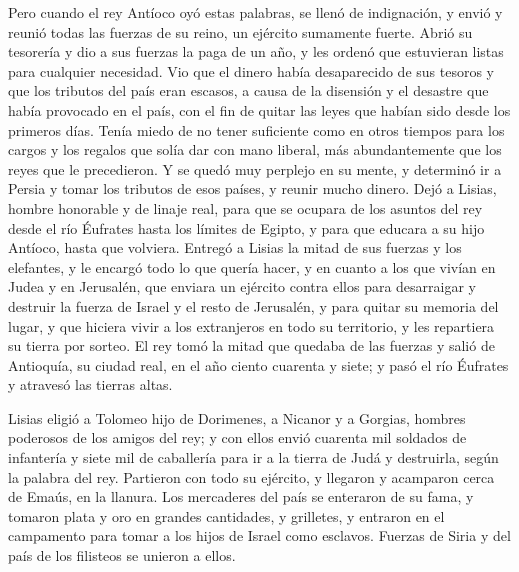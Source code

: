  Pero cuando el rey Antíoco oyó estas palabras, se llenó
de indignación, y envió y reunió todas las fuerzas de su reino, un
ejército sumamente fuerte.  Abrió su tesorería y dio a
sus fuerzas la paga de un año, y les ordenó que estuvieran listas para
cualquier necesidad.  Vio que el dinero había
desaparecido de sus tesoros y que los tributos del país eran escasos, a
causa de la disensión y el desastre que había provocado en el país, con
el fin de quitar las leyes que habían sido desde los primeros días.
 Tenía miedo de no tener suficiente como en otros tiempos
para los cargos y los regalos que solía dar con mano liberal, más
abundantemente que los reyes que le precedieron.  Y se
quedó muy perplejo en su mente, y determinó ir a Persia y tomar los
tributos de esos países, y reunir mucho dinero.  Dejó a
Lisias, hombre honorable y de linaje real, para que se ocupara de los
asuntos del rey desde el río Éufrates hasta los límites de Egipto,
 y para que educara a su hijo Antíoco, hasta que
volviera.  Entregó a Lisias la mitad de sus fuerzas y los
elefantes, y le encargó todo lo que quería hacer, y en cuanto a los que
vivían en Judea y en Jerusalén,  que enviara un ejército
contra ellos para desarraigar y destruir la fuerza de Israel y el resto
de Jerusalén, y para quitar su memoria del lugar,  y que
hiciera vivir a los extranjeros en todo su territorio, y les repartiera
su tierra por sorteo.  El rey tomó la mitad que quedaba
de las fuerzas y salió de Antioquía, su ciudad real, en el año ciento
cuarenta y siete; y pasó el río Éufrates y atravesó las tierras altas.

 Lisias eligió a Tolomeo hijo de Dorimenes, a Nicanor y a
Gorgias, hombres poderosos de los amigos del rey;  y con
ellos envió cuarenta mil soldados de infantería y siete mil de
caballería para ir a la tierra de Judá y destruirla, según la palabra
del rey.  Partieron con todo su ejército, y llegaron y
acamparon cerca de Emaús, en la llanura.  Los mercaderes
del país se enteraron de su fama, y tomaron plata y oro en grandes
cantidades, y grilletes, y entraron en el campamento para tomar a los
hijos de Israel como esclavos. Fuerzas de Siria y del país de los
filisteos se unieron a ellos.

